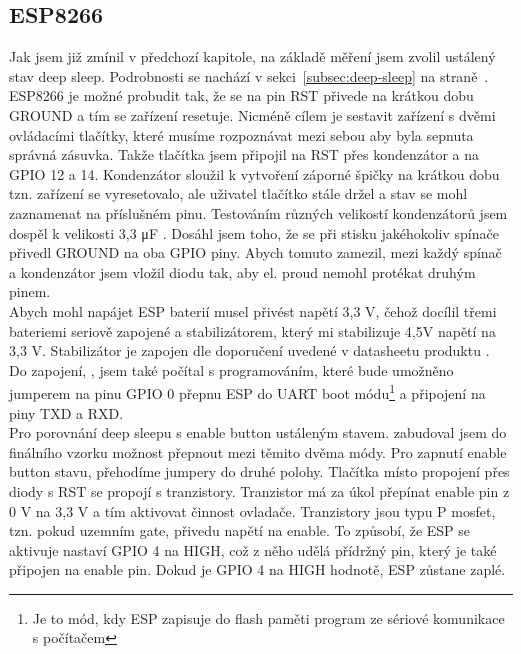 \documentclass[a4paper, 12pt]{report}
\begin{document}
    \subsection{ESP8266}
    Jak jsem již zmínil v předchozí kapitole, na základě měření jsem zvolil ustálený stav deep sleep.
    Podrobnosti se nachází v sekci~\ref{subsec:deep-sleep} na straně~\pageref{subsec:deep-sleep}.
    ESP8266 je možné probudit tak, že se na pin RST přivede na krátkou dobu GROUND a tím se zařízení resetuje.
    Nicméně cílem je sestavit zařízení s dvěmi ovládacími tlačítky, které musíme rozpoznávat mezi sebou aby byla sepnuta správná zásuvka.
    Takže tlačítka jsem připojil na RST přes kondenzátor a na GPIO 12 a 14.
    Kondenzátor sloužil k vytvoření záporné špičky na krátkou dobu tzn. zařízení se vyresetovalo, ale uživatel tlačítko stále držel a stav se mohl zaznamenat na příslušném pinu.
    Testováním různých velikostí kondenzátorů jsem dospěl k velikosti 3,3 \si{\micro F} .
    Dosáhl jsem toho, že se při stisku jakéhokoliv spínače přivedl GROUND na oba GPIO piny.
    Abych tomuto zamezil, mezi každý spínač a kondenzátor jsem vložil diodu tak, aby el. proud nemohl protékat druhým pinem. \\
    Abych mohl napájet ESP baterií musel přivést napětí 3,3 \si{V}, čehož docílil třemi bateriemi seriově zapojené a stabilizátorem, který mi stabilizuje 4,5\si{V} napětí na 3,3 \si{V}.
    Stabilizátor je zapojen dle doporučení uvedené v datasheetu produktu .\\
    Do zapojení, , jsem také počítal s programováním, které bude umožněno jumperem na pinu GPIO 0 přepnu ESP do UART boot módu\footnote{Je to mód, kdy ESP zapisuje do flash paměti program ze sériové komunikace s počítačem} a připojení na piny TXD a RXD\@. \\
    Pro porovnání deep sleepu s enable button ustáleným stavem.
    zabudoval jsem do finálního vzorku možnost přepnout mezi těmito dvěma módy.
    Pro zapnutí enable button stavu, přehodíme jumpery do druhé polohy.
    Tlačítka místo propojení přes diody s RST se propojí s tranzistory.
    Tranzistor má za úkol přepínat enable pin z 0 V na 3,3 V a tím aktivovat činnost ovladače.
    Tranzistory jsou typu P mosfet, tzn. pokud uzemním gate, přivedu napětí na enable.
    To způsobí, že ESP se aktivuje nastaví GPIO 4 na HIGH, což z něho udělá přídržný pin, který je také připojen na enable pin. Dokud je GPIO 4 na HIGH hodnotě, ESP zůstane zaplé.
\end{document}
